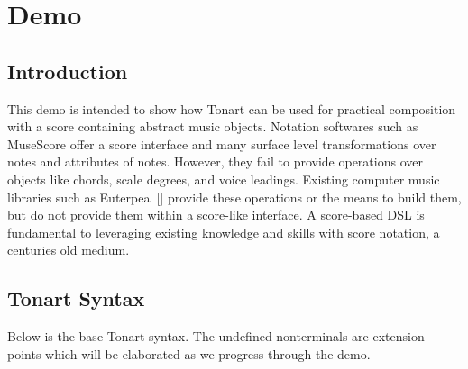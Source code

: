 \documentclass[10pt, sigplan]{acmart}
\let\Footnote\undefined
\newcommand{\sectionNewpage}{}
\newcommand{\textsuper}[1]{$^{\hbox{\textsmaller{#1}}}$}
\let\SOriginalthesubsection\thesubsection
\let\SOriginalthesubsubsection\thesubsubsection
\newcommand{\Ssection}[2]{\section[#1]{#2}\let\thesubsection\SOriginalthesubsection}
\newcommand{\Ssubsection}[2]{\subsection[#1]{#2}\let\thesubsubsection\SOriginalthesubsubsection}
\newcommand{\AutobibLink}[1]{\color{ACMPurple}{#1}}
\newcommand{\Footnote}[1]{\footnote{#1}}
\newcommand{\FootnoteRef}[1]{}
\newcommand{\FootnoteTarget}[1]{}
\newcommand{\FootnoteContent}[1]{#1}
\newenvironment{FootnoteBlock}{\renewcommand{\noindent}{}}{}
\newcommand{\FootnoteBlockContent}[1]{}
\newcommand{\Autobibref}[1]{#1}
\providecommand{\AutobibLink}[1]{#1}
\begin{document}
\noindent 

\noindent 

\noindent 

\sectionNewpage

\Ssection{Demo}{Demo}\label{t:x28part_x22Demox22x29}



\Ssubsection{Introduction}{Introduction}\label{t:x28part_x22Introductionx22x29}

This demo is intended to show how Tonart can be used for practical composition
with a score containing abstract music objects.  Notation softwares such as
MuseScore\Footnote{\FootnoteRef{\textsuper{\hyperref[t:x28x7ccounterx2dx28x29x7c_x23x28structx3ageneratedx2dtagx29x29]{1}}}\FootnoteContent{https://musescore.org/en}} offer a score interface and
many surface level transformations over notes and attributes of notes.  However,
they fail to provide operations over objects like chords, scale degrees, and
voice leadings.  Existing computer music libraries such as
Euterpea\Autobibref{~[\hyperref[t:x28autobib_x22Px2e_HudakEuterpea2014httpx3ax2fx2feuterpeax2ecomx22x29]{\AutobibLink{1}}]} provide these operations or the means to build
them, but do not provide them within a score{-}like interface.  A score{-}based DSL
is fundamental to leveraging existing knowledge and skills with score notation,
a centuries old medium.\label{t:x28part_x28gentag_0x29x29}

\begin{FootnoteBlock}\FootnoteBlockContent{\FootnoteTarget{\textsuper{\label{t:x28x7ccounterx2dx28x29x7c_x28gentag_1x29x29}\textsf{1}}}https://musescore.org/en}\end{FootnoteBlock}

\Ssubsection{Tonart Syntax}{Tonart Syntax}\label{t:x28part_x22Tonartx5fSyntaxx22x29}

Below is the base Tonart syntax.  The undefined nonterminals are extension points which will be
elaborated as we progress through the demo.
\hspace*{\fill}\\


\noindent 
\end{document}

